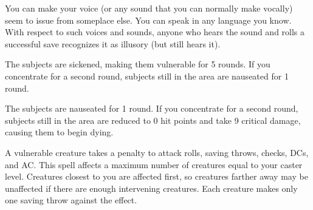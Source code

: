 \spellrng{\rngclose}
\begin{spelleffect}
  You can make your voice (or any sound that you can normally make vocally) seem to issue from someplace else. You can speak in any language you know. With respect to such voices and sounds, anyone who hears the sound and rolls a successful save recognizes it as illusory (but still hears it).
\end{spelleffect}

\begin{comment}
\spellsection{Vestments of the Mage}
\spelldesc{You imbue a set of armor with magical power, preventing it from interfering with your spellcasting.}
\spellschool{Transmutation (Imbuement)}
\spelllvl{Sor/Wiz 2}
\spellrng{Touch}
\spelltgt{Touched nonmagical armor or shield}
\spelldur{\durext (D)}
\spellsave{Will negates (harmless, object)}
\spellsr{Yes (Will)}
\begin{spelleffect}
  The armor or shield's chance of arcane spell failure decreases by 10\% as long as you are wearing or using it. If any other creature wears the armor, it receives no benefit from this spell.
\end{spelleffect}
\begin{spellnotes}
  This decrease is considered an enhancement enhancement bonus.
\end{spellnotes}
\end{comment}

\begin{spellhealthy}
  The subjects are sickened, making them vulnerable for 5 rounds. If you concentrate for a second round, subjects still in the area are nauseated for 1 round.
\end{spellhealthy}
\begin{spellblood}
  The subjects are nauseated for 1 round. If you concentrate for a second round, subjects still in the area are reduced to 0 hit points and take 9 critical damage, causing them to begin dying.
\end{spellblood}
\begin{spellnotes}
  A vulnerable creature takes a  penalty to attack rolls, saving throws, checks, DCs, and AC.
  This spell affects a maximum number of creatures equal to your caster level. Creatures closest to you are affected first, so creatures farther away may be unaffected if there are enough intervening creatures. Each creature makes only one saving throw against the effect.
\end{spellnotes}

